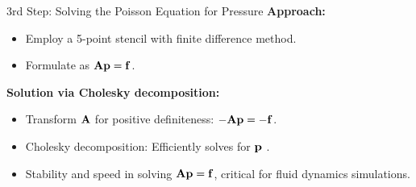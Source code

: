 

\begin{frame}{3rd Step: Solving the Poisson Equation for Pressure}
    \textbf{Approach:}
    \begin{itemize}
        \item {} Employ a 5-point stencil with finite difference method.
        \item {} Formulate as $\boldsymbol{\mathrm{A}}\boldsymbol{\mathrm{p}}=\boldsymbol{\mathrm{f}}$.
    \end{itemize}
    
    \textbf{Solution via Cholesky decomposition:}
    \begin{itemize}
        \item Transform \(\boldsymbol{\mathrm{A}}\) for positive definiteness: \(-\boldsymbol{\mathrm{A}}\boldsymbol{\mathrm{p}} = -\boldsymbol{\mathrm{f}}\).
        \item Cholesky decomposition: Efficiently solves for \(\boldsymbol{\mathrm{p}}\) .
        \item Stability and speed in solving \(\boldsymbol{\mathrm{A}}\boldsymbol{\mathrm{p}}=\boldsymbol{\mathrm{f}}\), critical for fluid dynamics simulations.
    \end{itemize}
    
\end{frame}






